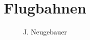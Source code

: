 \documentclass[10pt, a4paper]{scrartcl}
\author{J. Neugebauer}
\title{Flugbahnen}
\date{\Heute}
\begin{document}
\ReiheTitel
\end{document}
